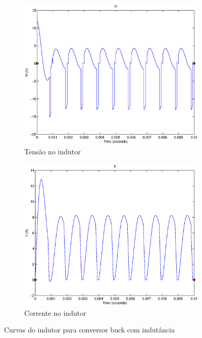 \documentclass{article}
\begin{document}
\begin{figure}[H]
	\centering
	\begin{subfigure}[b]{0.4\linewidth}
		\includegraphics[width=\linewidth]{matlab/buck/b_vl2}
		\caption{Tensão no indutor}
	\end{subfigure}
	\begin{subfigure}[b]{0.4\linewidth}
		\centering
		\includegraphics[width=\linewidth]{matlab/buck/b_il2}
		\caption{Corrente no indutor}
	\end{subfigure}
	\caption{Curvas do indutor para conversor buck com indutância }
	\label{fig:bl2}
\end{figure}
\end{document}
